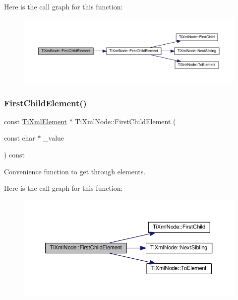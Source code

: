 Here is the call graph for this function\+:
\nopagebreak
\begin{figure}[H]
\begin{center}
\leavevmode
\includegraphics[width=350pt]{class_ti_xml_node_aa0fecff1f3866ab33a8a25506e95db1d_cgraph}
\end{center}
\end{figure}
\mbox{\label{class_ti_xml_node_aab23fca4c2455c1d926c35d85a663842}} 
\subsubsection{\texorpdfstring{First\+Child\+Element()}{FirstChildElement()}\hspace{0.1cm}{\footnotesize\ttfamily [3/4]}}
{\footnotesize\ttfamily const \hyperlink{class_ti_xml_element}{Ti\+Xml\+Element} $\ast$ Ti\+Xml\+Node\+::\+First\+Child\+Element (\begin{DoxyParamCaption}\item[{const char $\ast$}]{\+\_\+value }\end{DoxyParamCaption}) const}



Convenience function to get through elements. 

Here is the call graph for this function\+:
\nopagebreak
\begin{figure}[H]
\begin{center}
\leavevmode
\includegraphics[width=350pt]{class_ti_xml_node_aab23fca4c2455c1d926c35d85a663842_cgraph}
\end{center}
\end{figure}
\mbox{\label{class_ti_xml_node_a6936ae323675071808ac4840379e57f5}} 
